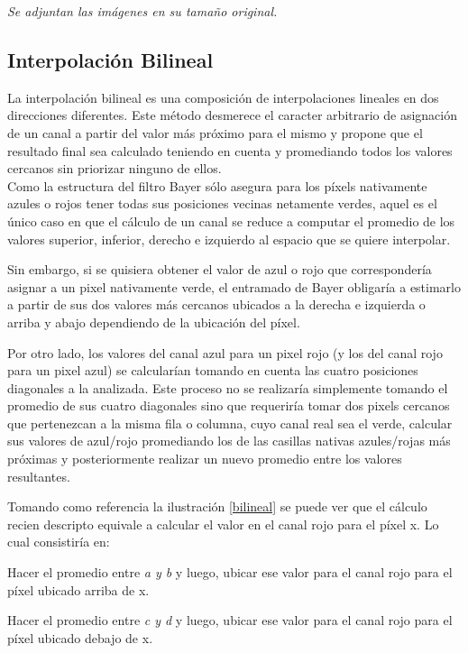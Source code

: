 \documentclass[a4paper]{article}
\begin{document}
\textit{Se adjuntan las im\'agenes en su tama\~no original.}

\newpage
\subsection{Interpolaci\'on Bilineal}

La interpolación bilineal es una composición de interpolaciones lineales en dos direcciones diferentes. Este método desmerece el caracter arbitrario de asignación de un canal a partir del valor más próximo para el mismo y propone que el resultado final sea calculado teniendo en cuenta y promediando todos los valores cercanos sin priorizar ninguno de ellos. \\

Como la estructura del filtro Bayer sólo asegura para los p\'ixels nativamente azules o rojos tener todas sus posiciones vecinas netamente verdes, aquel es el único caso en que el cálculo de un canal se reduce a computar el promedio de los valores superior, inferior, derecho e izquierdo al espacio que se quiere interpolar.

Sin embargo, si se quisiera obtener el valor de azul o rojo que correspondería asignar a un pixel nativamente verde, el entramado de Bayer obligaría a estimarlo a partir de sus dos valores m\'as cercanos ubicados a la derecha e izquierda o arriba y abajo dependiendo de la ubicaci\'on del p\'ixel. 

Por otro lado, los valores del canal azul para un pixel rojo (y los del canal rojo para un pixel azul) se calcularían tomando en cuenta las cuatro posiciones diagonales a la analizada. Este proceso no se realizar\'ia simplemente tomando el promedio de sus cuatro diagonales sino que requeriría tomar dos pixels cercanos que pertenezcan a la misma fila o columna, cuyo canal real sea el verde, calcular sus valores de azul/rojo promediando los de las casillas nativas azules/rojas más próximas y posteriormente realizar un nuevo promedio entre los valores resultantes.

Tomando como referencia la ilustración \ref{bilineal} se puede ver que el cálculo recien descripto equivale a calcular el valor en el canal rojo para el p\'ixel x. Lo cual consistir\'ia en: 

Hacer el promedio entre \textit{a y b} y luego, ubicar ese valor para el canal rojo para el p\'ixel ubicado arriba de x.

Hacer el promedio entre \textit{c y d} y luego, ubicar ese valor para el canal rojo para el p\'ixel ubicado debajo de x.
\end{document}
